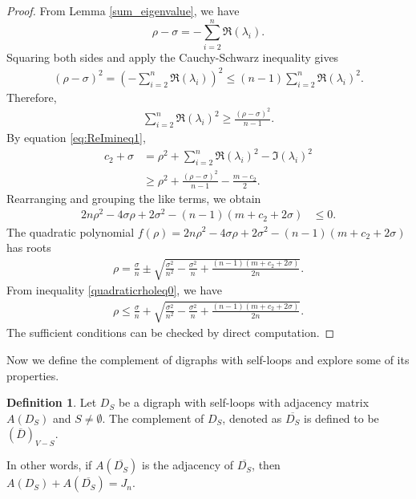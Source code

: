 \documentclass[12pt,a4paper,reqno]{amsart}
\numberwithin{equation}{section}
\theoremstyle{plain}
\theoremstyle{definition}
\newtheorem{definition}[theorem]{Definition}
\newcommand{\<}{\langle}
\renewcommand{\>}{\rangle}
\begin{document}
    \begin{proof}
    From Lemma \ref{sum_eigenvalue}, we have 
    $$\rho-\sigma=-\sum_{i=2}^n \Re(\lambda_i).$$
    Squaring both sides and apply the Cauchy-Schwarz inequality gives
    \begin{align*}
        (\rho-\sigma)^2= \left( -\sum_{i=2}^n \Re(\lambda_i) \right)^2 \leq (n-1)\sum_{i=2}^n \Re(\lambda_i)^2.
    \end{align*}
    Therefore, 
    \begin{align*}
        \sum_{i=2}^n \Re(\lambda_i)^2 \geq \frac{(\rho-\sigma)^2}{n-1}.
    \end{align*}
    By equation \eqref{eq:ReImineq1},
    \begin{align*}
        c_2+\sigma &= \rho^2 + \sum_{i=2}^n \Re(\lambda_i)^2 - \Im(\lambda_i)^2\\
        &\geq \rho^2 + \frac{(\rho-\sigma)^2}{n-1} - \frac{m-c_2}{2}.
    \end{align*}
    Rearranging and grouping the like terms, we obtain
    \begin{align}
    \label{quadraticrholeq0}
        2n\rho^2-4\sigma\rho+2\sigma^2-(n-1)(m+c_2+2\sigma) &\leq0.
    \end{align}
    The quadratic polynomial $f(\rho)=2n\rho^2-4\sigma\rho+2\sigma^2-(n-1)(m+c_2+2\sigma)$ has roots 
    \begin{align*}
        \rho = \frac{\sigma}{n} \pm \sqrt{\frac{\sigma^2}{n^2}-\frac{\sigma^2}{n}+\frac{(n-1)(m+c_2+2\sigma)}{2n}}.
    \end{align*}
    From inequality \eqref{quadraticrholeq0}, we have 
    \begin{align*}
        \rho \leq \frac{\sigma}{n} + \sqrt{\frac{\sigma^2}{n^2}-\frac{\sigma^2}{n}+\frac{(n-1)(m+c_2+2\sigma)}{2n}}.
    \end{align*}
    The sufficient conditions can be checked by direct computation.
    \end{proof}

    Now we define the complement of digraphs with self-loops and explore some of its properties.
    \begin{definition}
        \label{complement_def}
        Let $D_S$ be a digraph with self-loops with adjacency matrix $A(D_S)$ and $S\neq \emptyset$. The complement of $D_S$, denoted as $\overline{D_S}$ is defined to be $(\overline{D})_{V-S}$. 
        
        In other words, if $A(\overline{D_S})$ is the adjacency of $\overline{D_S}$, then $A(D_S)+A(\overline{D_S})=J_n.$
    \end{definition}
\end{document}
